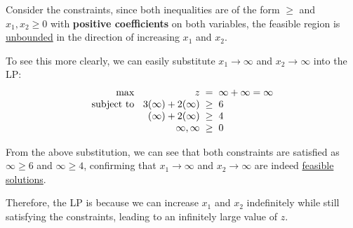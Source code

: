 \documentclass[a4paper, 10pt]{article}
\begin{document}
\begin{solution}
Consider the constraints, since both inequalities are of the form \( \boxed{\geq} \) and \( \boxed{x_1, x_2 \geq 0} \) with \textbf{positive coefficients} on both variables,
the feasible region is \underline{unbounded} in the direction of increasing \( x_1 \) and \( x_2 \).

\vspace{2mm}

\par\hspace{5mm} To see this more clearly, we can easily substitute \( x_1 \to \infty \) and \( x_2 \to \infty \) into the LP:
\[
\begin{array}{@{\hspace{2mm}} r @{\hspace{2mm}} r @{\hspace{2mm}} c @{\hspace{2mm}} l}
    \text{max } & z & = & \infty + \infty = \infty \\
    \text{subject to } & 3(\infty) + 2(\infty) & \geq & 6 \\
    & (\infty) + 2(\infty) & \geq & 4 \\
    & \infty, \infty & \geq & 0
\end{array}
\]

From the above substitution, we can see that both constraints are satisfied as \( \infty \geq 6 \) and \( \infty \geq 4 \), confirming that \( x_1 \to \infty \) and \( x_2 \to \infty \) are indeed \underline{feasible solutions}.

\vspace{2mm}

\par\hspace{5mm} Therefore, the LP is  because we can increase \( x_1 \) and \( x_2 \) indefinitely while still satisfying the constraints, leading to an infinitely large value of \( z \).
\end{solution}

\newpage
\end{document}
